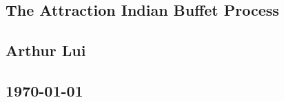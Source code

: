 \documentclass{article}
\begin{document}
                                                          
\begin{center}                                                            
  \section*{\textbf{The Attraction Indian Buffet Process}}
  \subsection*{\textbf{Arthur Lui}}                                       
  \subsection*{\noindent\today}                                           
\end{center}                                                              
\end{document}
